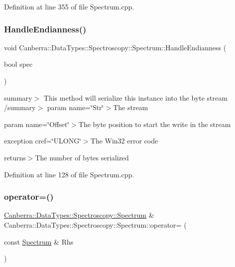 Definition at line 355 of file Spectrum.\+cpp.

\mbox{\label{class_canberra_1_1_data_types_1_1_spectroscopy_1_1_spectrum_a6f7a1311daeb8057eb6b134fe46717ee_a6f7a1311daeb8057eb6b134fe46717ee}} 
\subsubsection{\texorpdfstring{Handle\+Endianness()}{HandleEndianness()}}
{\footnotesize\ttfamily void Canberra\+::\+Data\+Types\+::\+Spectroscopy\+::\+Spectrum\+::\+Handle\+Endianness (\begin{DoxyParamCaption}\item[{bool}]{spec }\end{DoxyParamCaption})\hspace{0.3cm}{\ttfamily [protected]}}

summary$>$ This method will serialize this instance into the byte stream /summary$>$ param name=\char`\"{}\+Str\char`\"{}$>$The stream

param name=\char`\"{}\+Offset\char`\"{}$>$The byte position to start the write in the stream

exception cref=\char`\"{}\+U\+L\+O\+N\+G\char`\"{}$>$The Win32 error code

returns$>$The number of bytes serialized

Definition at line 128 of file Spectrum.\+cpp.

\mbox{\label{class_canberra_1_1_data_types_1_1_spectroscopy_1_1_spectrum_aed440d314387e7ccb55437bcf1921d48_aed440d314387e7ccb55437bcf1921d48}} 
\subsubsection{\texorpdfstring{operator=()}{operator=()}}
{\footnotesize\ttfamily \hyperlink{class_canberra_1_1_data_types_1_1_spectroscopy_1_1_spectrum}{Canberra\+::\+Data\+Types\+::\+Spectroscopy\+::\+Spectrum} \& Canberra\+::\+Data\+Types\+::\+Spectroscopy\+::\+Spectrum\+::operator= (\begin{DoxyParamCaption}\item[{const \hyperlink{class_canberra_1_1_data_types_1_1_spectroscopy_1_1_spectrum}{Spectrum} \&}]{Rhs }\end{DoxyParamCaption})}

